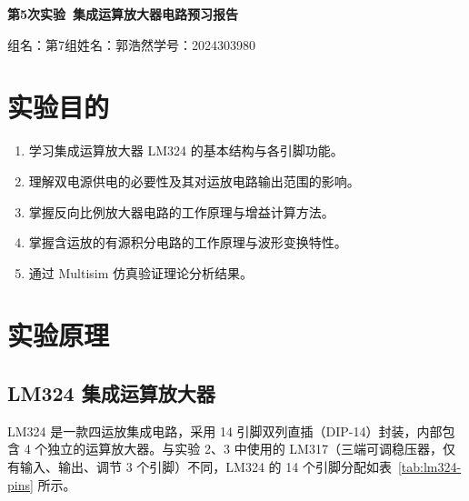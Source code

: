 \documentclass[12pt]{ctexart}
\begin{document}
\thispagestyle{empty}

\begin{center}
    \LARGE\textbf{第5次实验\ 集成运算放大器电路预习报告}

    \vspace{1cm}
    \normalsize
    组名：第7组\quad 姓名：郭浩然\quad 学号：2024303980
\end{center}

\vspace{1cm}


\section{实验目的}

\begin{enumerate}[label=\arabic*.]
    \item 学习集成运算放大器 LM324 的基本结构与各引脚功能。
    \item 理解双电源供电的必要性及其对运放电路输出范围的影响。
    \item 掌握反向比例放大器电路的工作原理与增益计算方法。
    \item 掌握含运放的有源积分电路的工作原理与波形变换特性。
    \item 通过 Multisim 仿真验证理论分析结果。
\end{enumerate}

\section{实验原理}

\subsection{LM324 集成运算放大器}

LM324 是一款四运放集成电路，采用 14 引脚双列直插（DIP-14）封装，内部包含 4 个独立的运算放大器。与实验 2、3 中使用的 LM317（三端可调稳压器，仅有输入、输出、调节 3 个引脚）不同，LM324 的 14 个引脚分配如表~\ref{tab:lm324-pins} 所示。
\end{document}
